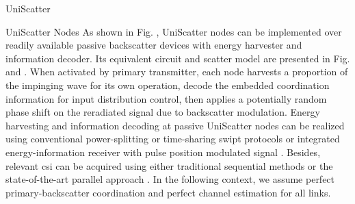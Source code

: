 \documentclass[journal]{IEEEtran}
\begin{document}
\begin{section}{UniScatter}
\begin{subsection}{UniScatter Nodes}
		As shown in Fig. , UniScatter nodes can be implemented over readily available passive backscatter devices with energy harvester and information decoder.
		Its equivalent circuit and scatter model are presented in Fig.  and .
		When activated by primary transmitter, each node harvests a proportion of the impinging wave for its own operation, decode the embedded coordination information for input distribution control, then applies a potentially random phase shift on the reradiated signal due to backscatter modulation.
		Energy harvesting and information decoding at passive UniScatter nodes can be realized using conventional power-splitting or time-sharing \gls{swipt} protocols \cite{Clerckx2019} or integrated energy-information receiver with pulse position modulated signal \cite{Kim2021a}.
		Besides, relevant \gls{csi} can be acquired using either traditional sequential methods \cite{Bharadia2015,Yang2015b,Guo2019g} or the state-of-the-art parallel approach \cite{Jin2021a}.
		In the following context, we assume perfect primary-backscatter coordination and perfect channel estimation for all links.
		\begin{figure*}[!t]
			\centering
			\caption{
			Block diagram, equivalent circuit, and scatter model of a UniScatter node.
			The solid and dashed vectors represent signal and energy flows.
			The scattering antenna behaves as a constant power source, where the voltage $V_0$ and current $I_0$ are introduced by incident electric field $\vec{E}_{\mathrm{I}}$ and magnetic field $\vec{H}_{\mathrm{I}}$ \cite{Huang2021}.
			}
			\label{fi:uniscatter_node}
		\end{figure*}
	\end{subsection}


\end{section}
\end{document}
